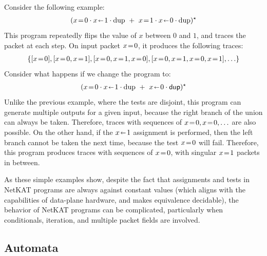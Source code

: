 \documentclass[acmsmall,dvipsnames,nonacm]{acmart}
\begin{document}
Consider the following example:
\begin{align*}
    (x \test 0 \cdot x \mut 1 \cdot \text{dup}\ +\ x \test 1 \cdot x \mut 0 \cdot \text{dup})^\star
\end{align*}
This program repeatedly flips the value of $x$ between $0$ and $1$,
and traces the packet at each step. On input packet $x\mathrel{\!=\!} 0$, it
produces the following traces:
\begin{align*}
    \{ [x\test0], [x\test 0, x\test 1], [x\test 0, x\test 1, x\test 0], [x\test 0, x\test 1, x\test 0, x\test 1], \ldots \}
\end{align*}
Consider what happens if we change the program to:
\begin{align*}
    (x \mathrel{\!=\!} 0 \cdot x \mathrel{\!\shortleftarrow\!} 1 \cdot \text{dup}\ +\ x \mathrel{\!\shortleftarrow\!} 0 \cdot \mathsf{dup})^\star
\end{align*}
Unlike the previous example, where the tests are disjoint, this
program can generate multiple outputs for a given input, because the
right branch of the union can always be taken.  Therefore, traces with
sequences of $x\mathrel{\!=\!} 0, x\mathrel{\!=\!} 0, \ldots$ are also possible.  On the
other hand, if the $x \mathrel{\!\shortleftarrow\!} 1$ assignment is performed, then the left
branch cannot be taken the next time, because the test $x \mathrel{\!=\!} 0$
will fail.  Therefore, this program produces traces with sequences of
$x \mathrel{\!=\!} 0$, with singular $x \mathrel{\!=\!} 1$ packets in between.

As these simple examples show, despite the fact that assignments and
tests in NetKAT programs are always against constant values (which
aligns with the capabilities of data-plane hardware, and makes
equivalence decidable), the behavior of NetKAT programs can be
complicated, particularly when conditionals, iteration, and multiple
packet fields are involved.

\subsection{\NetKAT Automata}\label{sec:automata}
\end{document}
